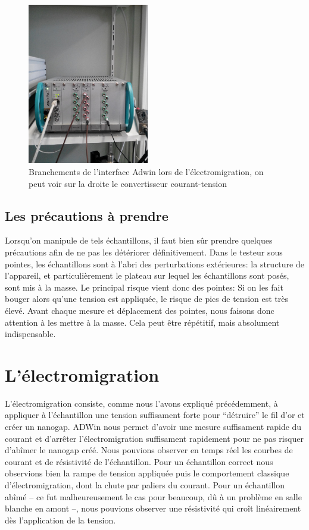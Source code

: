 \begin{figure}[h]
    \begin{center}
        \includegraphics[trim=0mm 0mm 80px 600px, clip, width=200px]{Photos/Branchements_ADWin.jpg}
        \caption{Branchements de l'interface Adwin lors de l'électromigration, on peut voir sur la droite le convertisseur courant-tension}
        \label{fig:}
    \end{center}
\end{figure}


\subsection{Les précautions à prendre}
Lorsqu'on manipule de tels échantillons, il faut bien sûr prendre quelques précautions afin de ne pas les détériorer définitivement.
Dans le testeur sous pointes, les échantillons sont à l'abri des perturbations extérieures: la structure de l'appareil, et particulièrement le plateau sur lequel les échantillons sont posés, sont mis à la masse.
Le principal risque vient donc des pointes: Si on les fait bouger alors qu'une tension est appliquée, le risque de pics de tension est très élevé. Avant chaque mesure et déplacement des pointes, nous faisons donc attention à les mettre à la masse. Cela peut être répétitif, mais absolument indispensable. 

\section{L'électromigration}
L'électromigration consiste, comme nous l'avons expliqué précédemment, à appliquer à l'échantillon une tension suffisament forte pour “détruire” le fil d'or et créer un nanogap.
ADWin nous permet d'avoir une mesure suffisament rapide du courant et d'arrêter l'électromigration suffisament rapidement pour ne pas risquer d'abîmer le nanogap créé.
Nous pouvions observer en temps réel les courbes de courant et de résistivité de l'échantillon. Pour un échantillon correct nous observions bien la rampe de tension appliquée puis le comportement classique d'électromigration, dont la chute par paliers du courant.
Pour un échantillon abîmé -- ce fut malheureusement le cas pour beaucoup, dû à un problème en salle blanche en amont --, nous pouvions observer une résistivité qui croît linéairement dès l'application de la tension.
